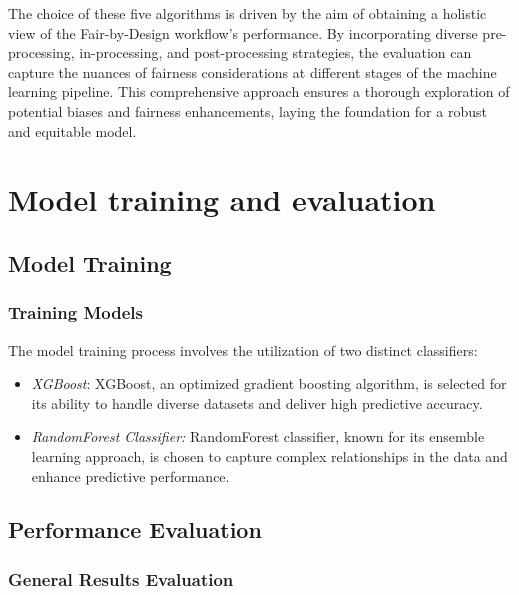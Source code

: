 The choice of these five algorithms is driven by the aim of obtaining a holistic view of the Fair-by-Design workflow's performance. By incorporating diverse pre-processing, in-processing, and post-processing strategies, the evaluation can capture the nuances of fairness considerations at different stages of the machine learning pipeline. This comprehensive approach ensures a thorough exploration of potential biases and fairness enhancements, laying the foundation for a robust and equitable model.

\section{Model training and evaluation}
\label{section:val_mt_eval}

\subsection{Model Training}

\subsubsection{Training Models}

The model training process involves the utilization of two distinct classifiers:

\begin{itemize}

    \item \emph{XGBoost}: XGBoost, an optimized gradient boosting algorithm, is selected for its ability to handle diverse datasets and deliver high predictive accuracy.

    \item \emph{RandomForest Classifier:} RandomForest classifier, known for its ensemble learning approach, is chosen to capture complex relationships in the data and enhance predictive performance.

\end{itemize}


\subsection{Performance Evaluation}

\subsubsection{General Results Evaluation}

